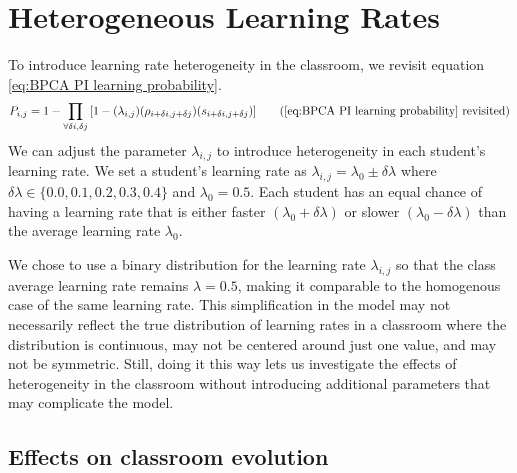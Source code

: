 \chapter{Heterogeneous Learning Rates}

To introduce learning rate heterogeneity in the classroom, we revisit equation \ref{eq:BPCA PI learning probability}. 
\begin{equation*}
    P_{i,j} = 1 - \prod_{\forall \delta i, \delta j}{\lbrack1-(\lambda_{i,j})(\rho_{i+\delta i, j+\delta j})(s_{i+\delta i, j+\delta j})}\rbrack
    \tag{\ref{eq:BPCA PI learning probability} revisited}
\end{equation*}
We can adjust the parameter $\lambda_{i,j}$ to introduce heterogeneity in each student's learning rate. 
We set a student's learning rate as $\lambda_{i,j} = \lambda_0 \pm \delta\lambda$ where $\delta\lambda \in \lbrace 0.0,0.1, 0.2, 0.3, 0.4\rbrace$ and $\lambda_0 = 0.5$. 
Each student has an equal chance of having a learning rate that is either faster $(\lambda_0 + \delta\lambda)$ or slower $(\lambda_0 - \delta\lambda)$ than the average learning rate $\lambda_0$.

We chose to use a binary distribution for the learning rate $\lambda_{i,j}$ so that the class average learning rate remains $\lambda=0.5$, making it comparable to the homogenous case of the same learning rate. 
This simplification in the model may not necessarily reflect the true distribution of learning rates in a classroom where the distribution is continuous, may not be centered around just one value, and may not be symmetric.
Still, doing it this way lets us investigate the effects of heterogeneity in the classroom without introducing additional parameters that may complicate the model.

\section{Effects on classroom evolution}\label{sec:BPCAIH effects on classroom evolution}
